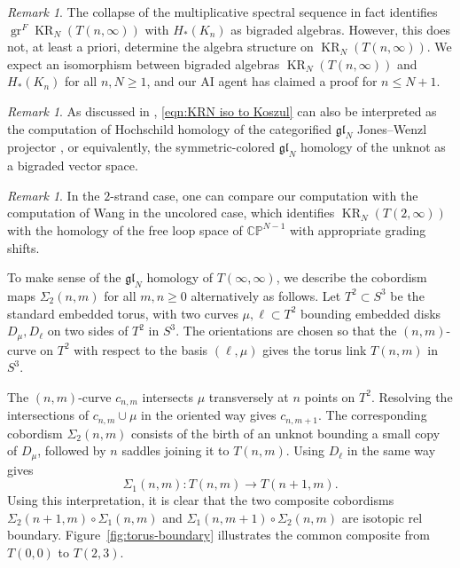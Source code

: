 \documentclass[reqno]{amsart}
\theoremstyle{definition}
\theoremstyle{remark}
\newtheorem{rem}[thm]{Remark}
\newcommand{\gl}{\mathfrak{gl}}
\newcommand{\CP}{\mathbb{CP}}
\DeclareMathOperator{\KR}{KR}
\begin{document}
\begin{rem}
The collapse of the multiplicative spectral sequence in fact identifies $\operatorname{gr}^F\KR_N(T(n,\infty))$ with $H_*(K_n)$ as bigraded algebras. However, this does not, at least a priori, determine the algebra structure on $\KR_N(T(n,\infty))$. We expect an isomorphism between bigraded algebras $\KR_N(T(n,\infty))$ and $H_*(K_n)$ for all $n,N\ge1$, and our AI agent has claimed a proof for $n\le N+1$.
\end{rem}

\begin{rem}
    As discussed in \cite[Section 1.1]{ballinger2025stable}, \eqref{eqn:KRN iso to Koszul} can also be interpreted as the computation of Hochschild homology of the categorified $\gl_N$ Jones--Wenzl projector \cite{hogancamp2018stable}, or equivalently, the symmetric-colored $\gl_N$ homology of the unknot as a bigraded vector space.
\end{rem}

\begin{rem}
    In the $2$-strand case, one can compare our computation with the computation of Wang \cite{wang2026loop} in the uncolored case, which identifies $\KR_N(T(2,\infty))$ with the homology of the free loop space of $\CP^{N-1}$ with appropriate grading shifts. %
\end{rem}

To make sense of the $\gl_N$ homology of $T(\infty,\infty)$, we describe the cobordism maps $\Sigma_2(n,m)$ for all $m,n\ge0$ alternatively as follows. Let $T^2\subset S^3$ be the standard embedded torus, with two curves $\mu,\ell\subset T^2$ bounding embedded disks $D_\mu,D_\ell$ on two sides of $T^2$ in $S^3$. The orientations are chosen so that the $(n,m)$-curve on $T^2$ with respect to the basis $(\ell,\mu)$ gives the torus link $T(n,m)$ in $S^3$.

The $(n,m)$-curve $c_{n,m}$ intersects $\mu$ transversely at $n$ points on $T^2$. Resolving the intersections of $c_{n,m}\cup\mu$ in the oriented way gives $c_{n,m+1}$. The corresponding cobordism $\Sigma_2(n,m)$ consists of the birth of an unknot bounding a small copy of $D_\mu$, followed by $n$ saddles joining it to $T(n,m)$. Using $D_\ell$ in the same way gives
\[\Sigma_1(n,m)\colon T(n,m)\to T(n+1,m).\]Using this interpretation, it is clear that the two composite cobordisms $\Sigma_2(n+1,m)\circ\Sigma_1(n,m)$ and $\Sigma_1(n,m+1)\circ\Sigma_2(n,m)$ are isotopic rel boundary. Figure~\ref{fig:torus-boundary} illustrates the common composite from $T(0,0)$ to $T(2,3)$.
\end{document}

